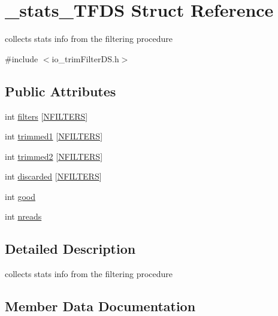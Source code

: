 \hypertarget{struct__stats__TFDS}{}\section{\+\_\+stats\+\_\+\+T\+F\+DS Struct Reference}
\label{struct__stats__TFDS}


collects stats info from the filtering procedure  




{\ttfamily \#include $<$io\+\_\+trim\+Filter\+D\+S.\+h$>$}

\subsection*{Public Attributes}
\begin{DoxyCompactItemize}
\item 
int \mbox{\hyperlink{struct__stats__TFDS_a8272cc0b600f4d7bd8e61f7d22afff50}{filters}} \mbox{[}\mbox{\hyperlink{defines_8h_a23f1103d8247781ab0be4b0fba2f085f}{N\+F\+I\+L\+T\+E\+RS}}\mbox{]}
\item 
int \mbox{\hyperlink{struct__stats__TFDS_a1b6637f8d945758c920ea95107a10379}{trimmed1}} \mbox{[}\mbox{\hyperlink{defines_8h_a23f1103d8247781ab0be4b0fba2f085f}{N\+F\+I\+L\+T\+E\+RS}}\mbox{]}
\item 
int \mbox{\hyperlink{struct__stats__TFDS_ac83a1c0eb87d51443fe75ce235047af8}{trimmed2}} \mbox{[}\mbox{\hyperlink{defines_8h_a23f1103d8247781ab0be4b0fba2f085f}{N\+F\+I\+L\+T\+E\+RS}}\mbox{]}
\item 
int \mbox{\hyperlink{struct__stats__TFDS_a1a48e89c58bc7216e40eda1828585512}{discarded}} \mbox{[}\mbox{\hyperlink{defines_8h_a23f1103d8247781ab0be4b0fba2f085f}{N\+F\+I\+L\+T\+E\+RS}}\mbox{]}
\item 
int \mbox{\hyperlink{struct__stats__TFDS_a2f3493a18118ed55ef04435439b9f0bd}{good}}
\item 
int \mbox{\hyperlink{struct__stats__TFDS_ab49cef985df92c496c0c673d32ec74c4}{nreads}}
\end{DoxyCompactItemize}


\subsection{Detailed Description}
collects stats info from the filtering procedure 

\subsection{Member Data Documentation}
\mbox{\label{struct__stats__TFDS_a1a48e89c58bc7216e40eda1828585512}} 
